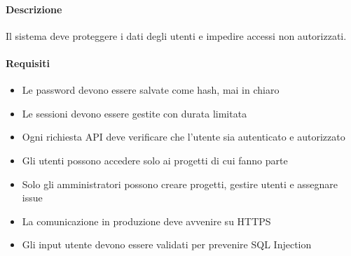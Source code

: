 \begin{reqbox}[title=REQ-NFR-04: Sicurezza]
\label{subsubsec:req-nfr-security}

\paragraph{Descrizione}
Il sistema deve proteggere i dati degli utenti e impedire accessi non autorizzati.

\paragraph{Requisiti}
\begin{itemize}[leftmargin=1.1em]
\item Le password devono essere salvate come hash, mai in chiaro
\item Le sessioni devono essere gestite con durata limitata
\item Ogni richiesta API deve verificare che l'utente sia autenticato e autorizzato
\item Gli utenti possono accedere solo ai progetti di cui fanno parte
\item Solo gli amministratori possono creare progetti, gestire utenti e assegnare issue
\item La comunicazione in produzione deve avvenire su HTTPS
\item Gli input utente devono essere validati per prevenire SQL Injection
\end{itemize}

\end{reqbox}

\vspace{0.5cm}

\newpage


